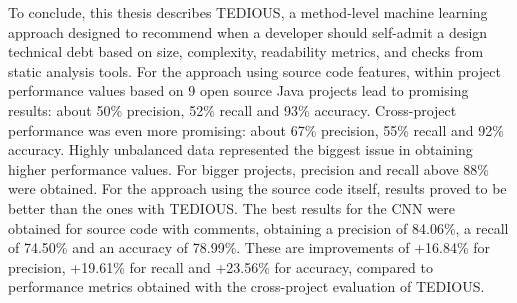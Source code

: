 

To conclude, this thesis describes \ac{TEDIOUS}, a method-level machine learning approach designed to recommend when a developer should self-admit a design technical debt based on size, complexity, readability metrics, and checks from static analysis tools. For the approach using source code features, within project performance values based on 9 open source Java projects lead to promising results: about 50\% precision, 52\% recall and 93\% accuracy. Cross-project performance was even more promising: about 67\% precision, 55\% recall and 92\% accuracy. Highly unbalanced data represented the biggest issue in obtaining higher performance values. For bigger projects, precision and recall above 88\% were obtained. For the approach using the source code itself, results proved to be better than the ones with TEDIOUS. The best results for the CNN were obtained for source code with comments, obtaining a precision of 84.06\%, a recall of 74.50\% and an accuracy of 78.99\%. These are improvements of +16.84\% for precision, +19.61\% for recall and +23.56\% for accuracy, compared to performance metrics obtained with the cross-project evaluation of TEDIOUS.


